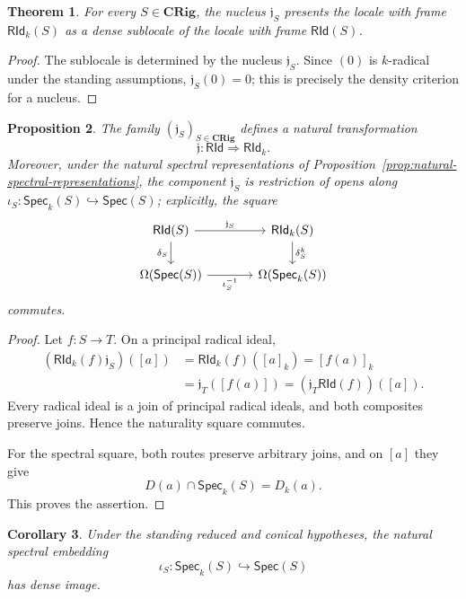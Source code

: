 \documentclass[12pt,leqno]{amsart}
\newcommand{\CRig}{\mathbf{CRig}}
\newcommand{\Spec}{\mathsf{Spec}}
\newcommand{\Speck}{\mathsf{Spec}_{k}}
\newcommand{\RId}{\mathsf{RId}}
\newcommand{\RIdk}{\mathsf{RId}_{k}}
\newtheorem{theorem}{Theorem}[section]
\newtheorem{proposition}[theorem]{Proposition}
\newtheorem{corollary}[theorem]{Corollary}
\theoremstyle{definition}
\numberwithin{equation}{section}
\theoremstyle{remark}
\begin{document}
\begin{theorem}\label{thm:k-radical-dense-sublocale}
For every \(S\in\CRig\), the nucleus \(\mathfrak j_S\) presents the locale with frame \(\RIdk(S)\) as a dense sublocale of the locale with frame \(\RId(S)\).
\end{theorem}

\begin{proof}
The sublocale is determined by the nucleus \(\mathfrak j_S\). Since $(0)$ is $k$-radical under the standing assumptions,
\(\mathfrak j_S(0)=0\); this is precisely the density criterion for a nucleus.
\end{proof}

\begin{proposition}\label{prop:natural-k-radical-comparison}
The family \((\mathfrak j_S)_{S\in\CRig}\) defines a natural transformation
\[
\mathfrak j\colon\RId\Longrightarrow\RIdk.
\]
Moreover, under the natural spectral representations of Proposition~\ref{prop:natural-spectral-representations}, the component \(\mathfrak j_S\) is restriction of opens along
\(\iota_S\colon\Speck(S)\hookrightarrow\Spec(S)\); explicitly, the square
\[
\begin{tikzcd}[column sep=large]
\RId(S) \arrow[r,"\mathfrak j_S"] \arrow[d,"\delta_S"']
  & \RIdk(S) \arrow[d,"\delta^k_S"] \\
\Omega(\Spec(S)) \arrow[r,"\iota_S^{-1}"']
  & \Omega(\Speck(S))
\end{tikzcd}
\]
commutes.
\end{proposition}

\begin{proof}
Let \(f\colon S\to T\). On a principal radical ideal,
\begin{align*}
(\RIdk(f)\mathfrak j_S)([a])
 &=\RIdk(f)([a]_k)=[f(a)]_k\\
 &=\mathfrak j_T([f(a)])
 =(\mathfrak j_T\RId(f))([a]).
\end{align*}
Every radical ideal is a join of principal radical ideals, and both composites preserve joins. Hence the naturality square commutes.

For the spectral square, both routes preserve arbitrary joins, and on \([a]\) they give
\[
D(a)\cap\Speck(S)=D_k(a).
\]
This proves the assertion.
\end{proof}

\begin{corollary}\label{cor:k-spectrum-dense}
Under the standing reduced and conical hypotheses, the natural spectral embedding
\[
\iota_S\colon\Speck(S)\hookrightarrow\Spec(S)
\]
has dense image.
\end{corollary}
\end{document}
